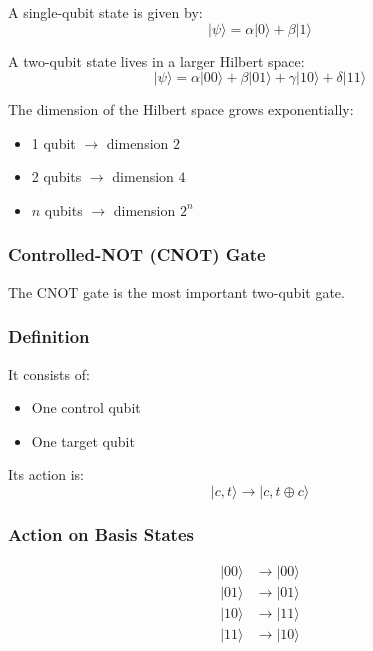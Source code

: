 A single-qubit state is given by:
\begin{equation}
|\psi\rangle = \alpha|0\rangle + \beta|1\rangle
\end{equation}

A two-qubit state lives in a larger Hilbert space:
\begin{equation}
|\psi\rangle = \alpha|00\rangle + \beta|01\rangle + \gamma|10\rangle + \delta|11\rangle
\end{equation}

The dimension of the Hilbert space grows exponentially:
\begin{itemize}
\item 1 qubit $\rightarrow$ dimension $2$
\item 2 qubits $\rightarrow$ dimension $4$
\item $n$ qubits $\rightarrow$ dimension $2^n$
\end{itemize}

\subsubsection{Controlled-NOT (CNOT) Gate}

The CNOT gate is the most important two-qubit gate.

\subsubsection*{Definition}

It consists of:
\begin{itemize}
\item One control qubit
\item One target qubit
\end{itemize}

Its action is:
\begin{equation}
|c, t\rangle \rightarrow |c, t \oplus c\rangle
\end{equation}

\subsubsection*{Action on Basis States}

\begin{align}
|00\rangle &\rightarrow |00\rangle \\
|01\rangle &\rightarrow |01\rangle \\
|10\rangle &\rightarrow |11\rangle \\
|11\rangle &\rightarrow |10\rangle
\end{align}

